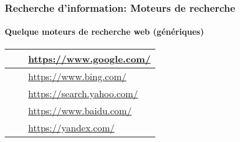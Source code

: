 \documentclass[xcolor=table]{beamer}
\begin{document}
\begin{frame}
\frametitle{Recherche d'information: Moteurs de recherche}
\framesubtitle{Quelque moteurs de recherche web (génériques)}

\def\arraystretch{0}

\begin{tabular}{L{.3\textwidth}{.8cm}cp{.6\textwidth}}%
	
	\hline
	
	 &
	& 
	\url{https://www.google.com/}  \\
	
	\hline
	
	 &
	& 
	\url{https://www.bing.com/} \\
	
	\hline
	
	 & 
	& 
	\url{https://search.yahoo.com/} \\
	
	\hline
	
	 & 
	& 
	\url{https://www.baidu.com/} \\
	
	\hline
	
	 & 
	& 
	\url{https://yandex.com/} \\
	
	\hline
	
\end{tabular}

\end{frame}
\end{document}
